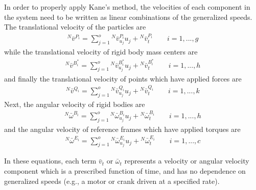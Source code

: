 \documentclass[smallcondensed,final]{svjour3}                     %
\begin{document}
In order to properly apply Kane's method, the velocities of each component in
the system need to be written as linear combinations of the generalized speeds.
The translational velocity of the particles are
\begin{align}
\label{eq:particle_translational}
{^N}\bar{v}^{P_i} = \sum^o_{j=1} {^N}\bar{v}^{P_i}_{u_j} u_j + {^N}\bar{v}^{P_i}_t
\quad \quad i=1,...,g
\end{align}
while the translational velocity of rigid body mass centers are
\begin{align}
\label{eq:rb_translational}
{^N}\bar{v}^{B_i^*} = \sum_{j=1}^o {^N}\bar{v}^{B_i^*}_{u_j} u_j +
{^N}\bar{v}^{B_i^*}_t \quad \quad i=1,...,h
\end{align}
and finally the translational velocity of points which have applied forces are
\begin{align}
\label{eq:points_translational}
{^N}\bar{v}^{Q_i} = \sum_{j=1}^o {^N}\bar{v}^{Q_i}_{u_j} u_j + {^N}\bar{v}^{Q_i}_t
\quad \quad i=1,...,k
\end{align}
Next, the angular velocity of rigid bodies are
\begin{align}
\label{eq:rb_rotational_bodies}
{^N}\bar{\omega}^{B_i} = \sum_{j=1}^o {^N}\bar{\omega}^{B_i}_{u_j} u_j +
{^N}\bar{\omega}^{B_i}_t \quad \quad i=1,...,h
\end{align}
and the angular velocity of reference frames which have applied torques are
\begin{align}
\label{eq:rb_rotational_frames}
{^N}\bar{\omega}^{E_i} = \sum_{j=1}^o {^N}\bar{\omega}^{E_i}_{u_j} u_j +
{^N}\bar{\omega}^{E_i}_t \quad \quad i=1,...,c
\end{align}

In these equations, each term $\bar{v}_t$ or $\bar{\omega}_t$ represents a
velocity or angular velocity component which is a prescribed function of time,
and has no dependence on generalized speeds (e.g., a motor or crank driven at a
specified rate).
\end{document}

